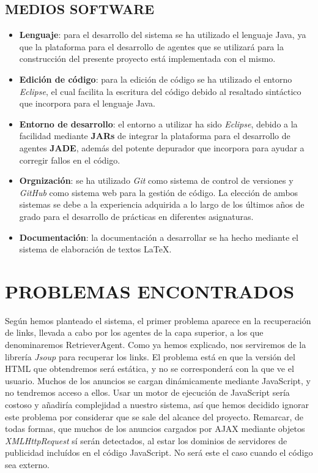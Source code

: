 \documentclass{pre-tfg}
\begin{document}
\subsection{MEDIOS SOFTWARE}

\begin{itemize}
 \item \textbf{Lenguaje}: para el desarrollo del sistema se ha utilizado el lenguaje Java, ya que la plataforma para el desarrollo 
 de agentes que se utilizará para la construcción del presente proyecto está implementada con el mismo.
 \item \textbf{Edición de código}: para la edición de código se ha utilizado el entorno \textit{Eclipse}, el cual facilita la escritura 
 del código debido al resaltado sintáctico que incorpora para el lenguaje Java.
 \item \textbf{Entorno de desarrollo}: el entorno a utilizar ha sido \textit{Eclipse}, debido a la facilidad mediante \textbf{JARs} de 
 integrar la plataforma para el desarrollo de agentes \textbf{JADE}, además del potente depurador que incorpora para ayudar a 
 corregir fallos en el código.
 \item \textbf{Orgnización}: se ha utilizado \textit{Git} como sistema de control de versiones y \textit{GitHub} como sistema web
 para la gestión de código. La elección de ambos sistemas se debe a la experiencia adquirida a lo largo de los últimos años de grado
 para el desarrollo de prácticas en diferentes asignaturas.
 \item \textbf{Documentación}: la documentación a desarrollar se ha hecho mediante el sistema de elaboración de textos \LaTeX.
\end{itemize}

\section{PROBLEMAS ENCONTRADOS}
Según hemos planteado el sistema, el primer problema aparece en la recuperación de links, llevada a cabo por los agentes de la capa superior,
a los que denominaremos RetrieverAgent. Como ya hemos explicado, nos serviremos de la librería \textit{Jsoup} para recuperar los links. El problema
está en que la versión del HTML que obtendremos será estática, y no se corresponderá con la que ve el usuario. Muchos de los anuncios se cargan dinámicamente
mediante JavaScript, y no tendremos acceso a ellos. Usar un motor de ejecución de JavaScript sería costoso y añadiría complejidad a nuestro sistema, así que hemos
decidido ignorar este problema por considerar que se sale del alcance del proyecto. Remarcar, de todas formas, que muchos de los anuncios cargados por AJAX mediante
objetos \textit{XMLHttpRequest} sí serán detectados, al estar los dominios de servidores de publicidad incluídos en el código JavaScript. No será este el caso cuando
el código sea externo.
\end{document}
